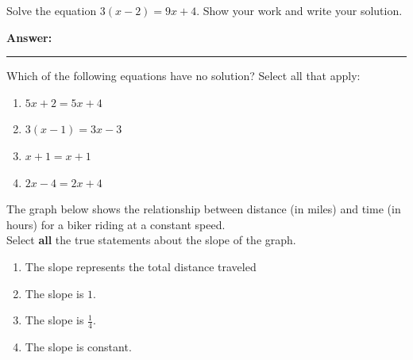 \documentclass[12pt]{article}
\begin{document}
\begin{tcolorbox}[colframe=black!50, colback=white, title=\textbf{Problem 7 (8.EE.C.7)}]
Solve the equation \(3(x - 2) = 9x + 4\). Show your work and write your solution.

\vspace{4cm}
\textbf{Answer:} \rule{0.5\textwidth}{0.4mm}
\end{tcolorbox}

\begin{tcolorbox}[colframe=black!50, colback=white, title=\textbf{Problem 8 (8.EE.C.7)}]
Which of the following equations have no solution? Select all that apply:

\begin{enumerate}[label=(\Alph*)]
    \item \(5x + 2 = 5x + 4\)
    \item \(3(x - 1) = 3x - 3\)
    \item \(x + 1 = x + 1\)
    \item \(2x - 4 = 2x + 4\)
\end{enumerate}
\end{tcolorbox}

\begin{tcolorbox}[colframe=black!50, colback=white, title=\textbf{Problem 9 (8.EE.B.5)}]
The graph below shows the relationship between distance (in miles) and time (in hours) for a biker riding at a constant speed. 
\vspace{0.5cm}\\
Select \textbf{all} the true statements about the slope of the graph.

\begin{center}
\end{center}

\begin{enumerate}[label=(\Alph*)]
    \item The slope represents the total distance traveled
    \item The slope is \( 1 \).
    \item The slope is \( \frac{1}{4} \).
    \item The slope is constant.
\end{enumerate}
\end{tcolorbox}
\end{document}
